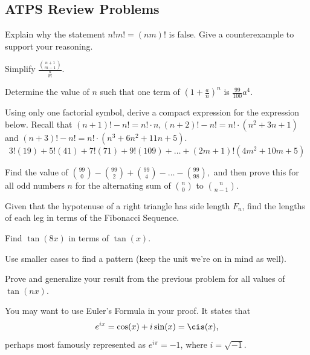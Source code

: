 \documentclass[11pt]{article}
\begin{document}
\subsection{ATPS Review Problems}
\begin{problem}[5]
    Explain why the statement $n!m! = (nm)!$ is false. Give a counterexample to support your reasoning.
\end{problem}
\begin{problem}[10]
    Simplify $\frac{\binom{n+1}{m-1}}{\frac{n}{m}}$.
\end{problem}
\begin{problem}[15]
    Determine the value of $n$ such that one term of $(1 + \frac{a}{n})^n$ is $\frac{99}{100}a^4$.
\end{problem}
\begin{problem}[25]
    Using only one factorial symbol, derive a compact expression for the expression below. Recall that $(n+1)! - n! = n!\cdot n, (n+2)! - n! = n!\cdot(n^2 +3n+1)$ and $(n+3)! - n! = n! \cdot (n^3+6n^2 +11n+5)$.
    \[3!(19)+5!(41)+7!(71)+9!(109)+\dots+(2m+1)!(4m^2 +10m+5)\]
\end{problem}
\begin{problem}[25]
    Find the value of $\binom{99}{0} - \binom{99}{2} + \binom{99}{4} - \dots - \binom{99}{98},$ and then prove this for all odd numbers $n$ for the alternating sum of $\binom{n}{0}$ to $\binom{n}{n-1}$.
\end{problem}
\begin{problem}[35]
    Given that the hypotenuse of a right triangle has side length $F_{n}$, find the lengths of each leg in terms of the Fibonacci Sequence.
\end{problem}
\begin{problem}[40]
    Find $\tan(8x)$ in terms of $\tan(x)$.
    \begin{hint}
        Use smaller cases to find a pattern (keep the unit we're on in mind as well).
    \end{hint}
\end{problem}
\begin{problem}[HM40]
    Prove and generalize your result from the previous problem for all values of $\tan(nx)$.
    \begin{remark}
        You may want to use Euler's Formula in your proof. It states that
        \[e^{ix} = \cos(x) + i\sin(x) = \cis(x),\]
        perhaps most famously represented as $e^{i\pi} = -1$, where $i = \sqrt{-1}$.
    \end{remark}
\end{problem}
\end{document}
